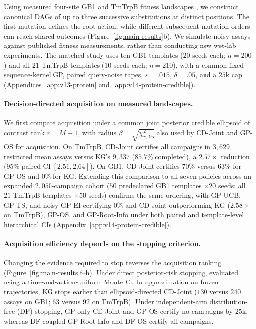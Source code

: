\documentclass{article}
\theoremstyle{plain}
\theoremstyle{definition}
\begin{document}
Using measured four-site GB1 and TmTrpB fitness landscapes
\citep{wu2016gb1,johnston2024trpb,dallago2021flip},
we construct canonical DAGs of up to three successive substitutions
at distinct positions. The first mutation defines the root action,
while different subsequent mutation orders can reach shared outcomes
(Figure~\ref{fig:main-results}b).
We simulate noisy assays against published fitness measurements,
rather than conducting new wet-lab experiments.
The matched study uses ten GB1 templates ($20$ seeds each;
$n=200$) and all $21$ TmTrpB templates ($10$ seeds each;
$n=210$), with a common fixed sequence-kernel GP, paired
query-noise tapes, $\varepsilon=.015$, $\delta=.05$,
and a $25$k cap (Appendices~\ref{app:v13-protein}
and~\ref{app:v14-protein-credible}).

\paragraph{Decision-directed acquisition on measured landscapes.}
We first compare acquisition under a common joint posterior credible
ellipsoid of contrast rank $r=M-1$, with radius
$\beta=\sqrt{\chi^2_{r,.95}}$ also used by CD-Joint and GP-OS
for acquisition. On TmTrpB, CD-Joint certifies all campaigns
in $3{,}629$ restricted mean assays versus KG's $9{,}337$
($85.7\%$ completed), a $2.57\times$ reduction
(95\% paired CI $[2.51,2.64]$). On GB1, CD-Joint certifies
$70\%$ versus $63\%$ for GP-OS and $0\%$ for KG.
Extending this comparison to all seven policies across an expanded
$2{,}050$-campaign cohort ($50$ predeclared GB1 templates $\times 20$
seeds; all $21$ TmTrpB templates $\times 50$ seeds) confirms the
same ordering, with GP-UCB, GP-TS, and noisy GP-EI certifying $0\%$
and CD-Joint outperforming KG ($2.58\times$ on TmTrpB), GP-OS, and
GP-Root-Info under both paired and template-level hierarchical CIs
(Appendix~\ref{app:v14-protein-credible}).


\paragraph{Acquisition efficiency depends on the stopping criterion.}
Changing the evidence required to stop reverses the acquisition
ranking (Figure~\ref{fig:main-results}f--h).
Under direct posterior-risk stopping, evaluated using a
time-and-action-uniform Monte Carlo approximation on frozen
trajectories, KG stops earlier than ellipsoid-directed CD-Joint
($130$ versus $240$ assays on GB1; $63$ versus $92$ on TmTrpB).
Under independent-arm distribution-free (DF) stopping, GP-only
CD-Joint and GP-OS certify no campaigns by $25$k, whereas
DF-coupled GP-Root-Info and DF-OS certify all campaigns.
\end{document}
